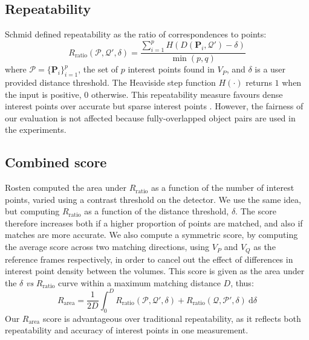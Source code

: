 \subsection{Repeatability}
Schmid \etal \cite{Schmid2000} defined repeatability as the ratio of correspondences to points:
\begin{equation}
R_\textrm{ratio}(\mathcal{P}, \mathcal{Q}', \delta) = \frac{\sum_{i=1}^p H(D(\mathbf{P}_i, \mathcal{Q}') - \delta)}{\min(p, q)}
\label{eqn/eval/repeatratio}
\end{equation}
where $\mathcal{P} = \{\mathbf{P}_i\}_{i=1}^{p}$, the set of $p$ interest points found in $V_P$, and $\delta$ is a user provided distance threshold. 
The Heaviside step function $H(\cdot)$ returns $1$ when the input is positive, $0$ otherwise.
This repeatability measure favours dense interest points over accurate but sparse interest points \cite{Willis2009}. 
However, the fairness of our evaluation is not affected because fully-overlapped object pairs are used in the experiments.

\subsection{Combined score}
Rosten \etal \cite{Rosten2010} computed the area under $R_\textrm{ratio}$ as a function of the number of interest points, varied using a contrast threshold on the detector. We use the same idea, but computing $R_\textrm{ratio}$ as a function of the distance threshold, $\delta$. The score therefore increases both if a higher proportion of points are matched, and also if matches are more accurate. We also compute a symmetric score, by computing the average score across two matching directions, using $V_P$ and $V_Q$ as the reference frames respectively, in order to  cancel out the effect of differences in interest point density between the volumes. This score is given as the area under the $\delta$ \emph{vs} $R_\textrm{ratio}$ curve within a maximum matching distance $D$, thus:
\begin{equation}
R_\textrm{area}=\frac{1}{2D}\int_{0}^{D}R_\textrm{ratio}(\mathcal{P}, \mathcal{Q}', \delta) + R_\textrm{ratio}(\mathcal{Q}, \mathcal{P}', \delta) ~ \textrm{d}\delta
\label{eqn/eval/rptarea}
\end{equation}
Our $R_{\textrm{area}}$ score is advantageous over traditional repeatability, as it reflects both repeatability and accuracy of interest points in one measurement. 



